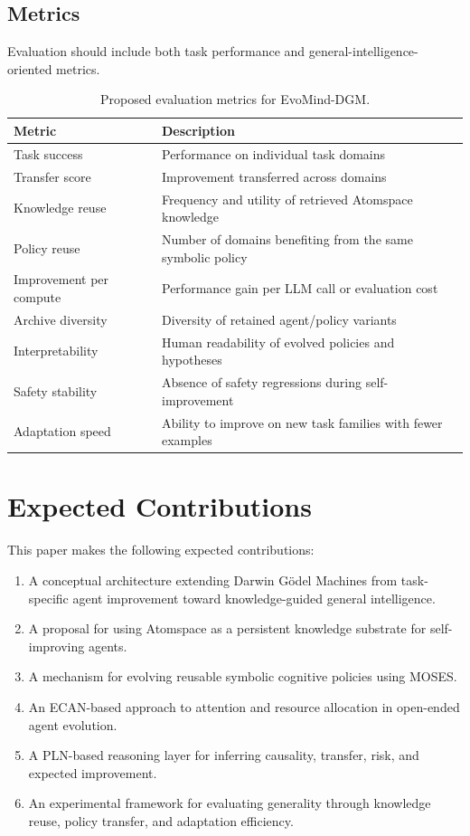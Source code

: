 \documentclass[11pt]{article}
\begin{document}
\subsection{Metrics}

Evaluation should include both task performance and general-intelligence-oriented metrics.

\begin{table}[h]
\centering
\begin{tabular}{ll}
\toprule
Metric & Description \\
\midrule
Task success & Performance on individual task domains \\
Transfer score & Improvement transferred across domains \\
Knowledge reuse & Frequency and utility of retrieved Atomspace knowledge \\
Policy reuse & Number of domains benefiting from the same symbolic policy \\
Improvement per compute & Performance gain per LLM call or evaluation cost \\
Archive diversity & Diversity of retained agent/policy variants \\
Interpretability & Human readability of evolved policies and hypotheses \\
Safety stability & Absence of safety regressions during self-improvement \\
Adaptation speed & Ability to improve on new task families with fewer examples \\
\bottomrule
\end{tabular}
\caption{Proposed evaluation metrics for EvoMind-DGM.}
\end{table}

\section{Expected Contributions}

This paper makes the following expected contributions:

\begin{enumerate}[leftmargin=*]
    \item A conceptual architecture extending Darwin G\"odel Machines from task-specific agent improvement toward knowledge-guided general intelligence.
    \item A proposal for using Atomspace as a persistent knowledge substrate for self-improving agents.
    \item A mechanism for evolving reusable symbolic cognitive policies using MOSES.
    \item An ECAN-based approach to attention and resource allocation in open-ended agent evolution.
    \item A PLN-based reasoning layer for inferring causality, transfer, risk, and expected improvement.
    \item An experimental framework for evaluating generality through knowledge reuse, policy transfer, and adaptation efficiency.
\end{enumerate}
\end{document}
